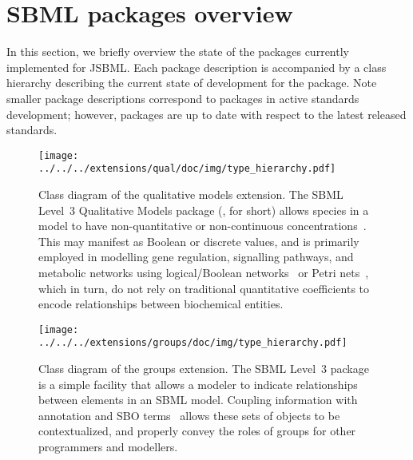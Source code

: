 
\section{SBML packages overview}
\label{sec:extensionsOverview}

In this section, we briefly overview the state of the \SBMLthree packages
currently implemented for JSBML. Each package description is accompanied by
a class hierarchy describing the current state of development for the
package. Note smaller package descriptions correspond to packages in active
standards development; however, packages are up to date with respect to the
latest released standards.

\begin{figure}[H]
  \vspace*{-3em}
 \centering
\texttt{[image: ../../../extensions/qual/doc/img/type\_hierarchy.pdf]}
 \vspace*{-5em}
 \caption[Class diagram of the qualitative models extension]{Class diagram of
   the qualitative models extension. The SBML Level~3 Qualitative Models
   package (, for short) allows species in a model to have
   non-quantitative or non-continuous concentrations~\cite{Chaouiya2013}.
   This may manifest as Boolean or discrete values, and is primarily employed
   in modelling gene regulation, signalling pathways, and metabolic networks
   using logical/Boolean networks~\cite{shmulevich2002} or Petri
   nets~\cite{breitling2008}, which in turn, do not rely on traditional
   quantitative coefficients to encode relationships between biochemical
   entities.}
 \label{fig:qual}
\end{figure}


\begin{figure}[H]
 \vspace*{-1em}
 \centering
\texttt{[image: ../../../extensions/groups/doc/img/type\_hierarchy.pdf]}
 \vspace*{-3em}
 \caption[Class diagram of the groups extension]{Class diagram of the groups
   extension. The SBML Level~3  package is a simple facility
   that allows a modeler to indicate relationships between elements in an
   SBML model. Coupling  information with annotation and SBO
   terms~\cite{Courtot2011a} allows these sets of objects to be
   contextualized, and properly convey the roles of groups for other
   programmers and modellers.}
 \label{fig:groups}
\end{figure}


